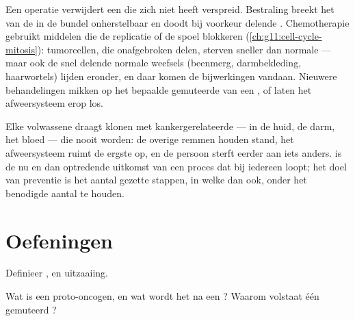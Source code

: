 \begin{example}\label{ex:g11:cancer:treatments}
Een operatie verwijdert een  die zich niet heeft verspreid.
Bestraling breekt het  van de  in de bundel onherstelbaar en
doodt bij voorkeur delende . Chemotherapie gebruikt middelen die de
replicatie of de spoel blokkeren (\cref{ch:g11:cell-cycle-mitosis}):
tumorcellen, die onafgebroken delen, sterven sneller dan normale 
--- maar ook de snel delende normale weefsels (beenmerg, darmbekleding,
haarwortels) lijden eronder, en daar komen de bijwerkingen vandaan.
Nieuwere behandelingen mikken op het bepaalde gemuteerde  van een
, of laten het afweersysteem erop los.
\end{example}

\begin{remark}\label{rem:g11:cancer:everyone}
Elke volwassene draagt klonen  met kankergerelateerde  ---
in de huid, de darm, het bloed --- die nooit  worden: de overige
remmen houden stand, het afweersysteem ruimt de ergste op, en de persoon
sterft eerder aan iets anders.  is de nu en dan optredende uitkomst
van een proces dat bij iedereen loopt; het doel van preventie is het
aantal gezette stappen, in welke  dan ook, onder het benodigde aantal
te houden.
\end{remark}

\section{Oefeningen}

\begin{exercise}[$\star$]\label{exo:g11:cancer:1}
Definieer ,  en uitzaaiing.
\end{exercise}

\begin{exercise}[$\star$]\label{exo:g11:cancer:2}
Wat is een proto-oncogen, en wat wordt het na een ? Waarom
volstaat één gemuteerd ?
\end{exercise}

